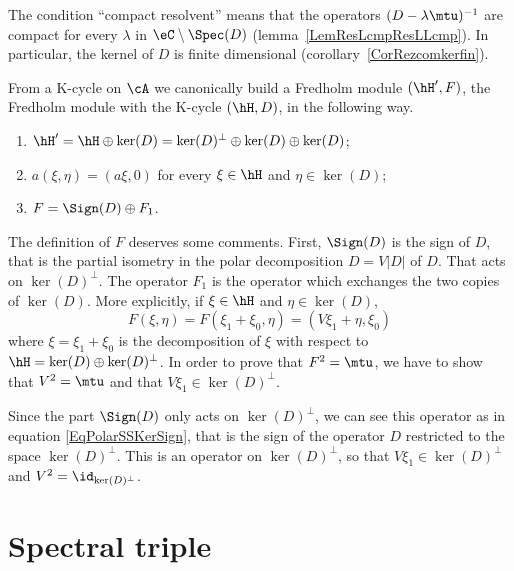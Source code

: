 \begin{remark}
	The condition ``compact resolvent'' means that the operators $(D-\lambda\mtu)^{-1}$ are compact for every $\lambda$ in $\eC\setminus\Spec(D)$ (lemma~\ref{LemResLcmpResLLcmp}). In particular, the kernel of $D$ is finite dimensional (corollary~\ref{CorRezcomkerfin}).
\end{remark}

From a K-cycle on $\cA$ we canonically build a Fredholm module $(\hH',F)$, the Fredholm module  with the K-cycle $(\hH,D)$, in the following way.
\begin{enumerate}
	\item
	      $\hH'=\hH\oplus\ker(D)=\ker(D)^{\perp}\oplus\ker(D)\oplus\ker(D)$;
	\item
	      $a(\xi,\eta)=(a\xi,0)$ for every $\xi\in\hH$ and $\eta\in\ker(D)$;
	\item
	      $F=\Sign(D)\oplus F_1$.
\end{enumerate}
The definition of $F$ deserves some comments. First, $\Sign(D)$ is the sign of $D$, that is the partial isometry in the polar decomposition $D=V| D |$ of $D$. That acts on $\ker(D)^{\perp}$. The operator $F_1$ is the operator which exchanges the two copies of $\ker(D)$. More explicitly, if $\xi\in\hH$ and $\eta\in\ker(D)$,
\begin{equation}
	F(\xi,\eta)=F(\xi_1+\xi_0,\eta)=(V\xi_1+\eta,\xi_0)
\end{equation}
where $\xi=\xi_1+\xi_0$ is the decomposition of $\xi$ with respect to $\hH=\ker(D)\oplus\ker(D)^{\perp}$. In order to prove that $F^2=\mtu$, we have to show that $V^2=\mtu$ and that $V\xi_1\in\ker(D)^{\perp}$.

Since the part $\Sign(D)$ only acts on $\ker(D)^{\perp}$, we can see this operator as in equation \eqref{EqPolarSSKerSign}, that is the sign of the operator $D$ restricted to the space $\ker(D)^{\perp}$. This is an operator on $\ker(D)^{\perp}$, so that $V\xi_1\in\ker(D)^{\perp}$ and $V^2=\id_{\ker(D)^{\perp}}$.

\section{Spectral triple}

